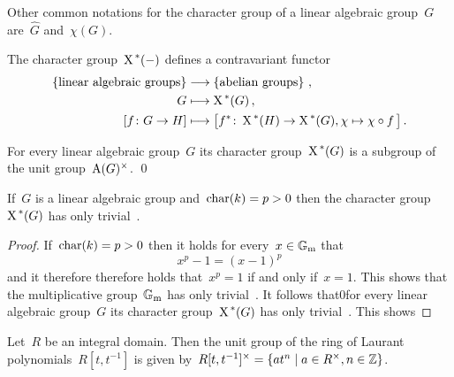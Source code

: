 \begin{remark}
  Other common notations for the character group of a linear algebraic group~$G$ are~$\widehat{G}$ and~$\chi(G)$.
\end{remark}


\begin{fluff}
  The character group~$\operatorname{X}^{\,*}(-)$ defines a contravariant functor
  \begin{align*}
    \left\{
      \text{linear algebraic groups}
    \right\}
    &\longrightarrow
    \left\{
      \text{abelian groups}
    \right\} \,,
    \\
                  G
    &\longmapsto  \operatorname{X}^{\,*}(G) \,,
    \\
                  [f \colon G \to H]
    &\longmapsto  \bigl[
                            f^*
                    \colon  \operatorname{X}^{\,*}(H)
                    \to     \operatorname{X}^{\,*}(G),
                            \chi
                    \mapsto \chi \circ f \,
                  \bigr] \,.
  \end{align*}
\end{fluff}


\begin{lemma}
  For every linear algebraic group~$G$ its character group~$\operatorname{X}^{\,*}(G)$ is a subgroup of the unit group~$\operatorname{A}(G)^\times$.
  \qed
\end{lemma}


\begin{lemma}
  If~$G$ is a linear algebraic group and~$\operatorname{char}(k) = p > 0$ then the character group~$\operatorname{X}^{\,*}(G)$ has only trivial~.
\end{lemma}


\begin{proof}
  If~$\operatorname{char}(k) = p > 0$ then it holds for every~$x \in \mathbb{G}_{\text{m}}$ that
  \[
      x^p - 1
    = (x - 1)^p
  \]
  and it therefore therefore holds that~$x^p = 1$ if and only if~$x = 1$.
  This shows that the multiplicative group~$\mathbb{G}_{\text{m}}$ has only trivial~.
  It follows that0for every linear algebraic group~$G$ its character group~$\operatorname{X}^{\,*}(G)$ has only trivial~.
  This shows 
\end{proof}


\begin{lemma}
  \label{units of laurant polynomials}
  Let~$R$ be an integral domain.
  Then the unit group of the ring of Laurant polynomials~$R[t,t^{-1}]$ is given by~$R[t,t^{-1}]^\times = \{ a t^n \suchthat a \in R^\times, n \in \Integer\}$.
\end{lemma}


